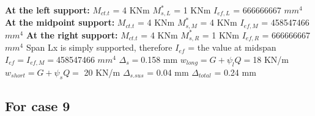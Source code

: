 \documentclass{article}%
\begin{document}
%
\newline%
\newline%
%
\textbf{At the left support:}%
\newline%
\newline%
%
$M_{ct.t}$ = 4 KNm%
\newline%
%
$M_{s,L}^{*}$ = 1 KNm%
\newline%
%
$I_{ef,L}$ = 666666667 $mm^{4}$%
\newline%
\newline%
%
\textbf{At the midpoint support:}%
\newline%
\newline%
%
$M_{ct.t}$ = 4 KNm%
\newline%
%
$M_{s,M}^{*}$ = 4 KNm%
\newline%
%
$I_{ef,M}$ = 458547466 $mm^{4}$%
\newline%
\newline%
%
\textbf{At the right support:}%
\newline%
\newline%
%
$M_{ct.t}$ = 4 KNm%
\newline%
%
$M_{s,R}^{*}$ = 1 KNm%
\newline%
%
$I_{ef,R}$ = 666666667 $mm^{4}$%
\newline%
\newline%
%
Span Lx is simply supported, therefore $I_{ef}$ = the value at midspan%
\newline%
\newline%
%
$I_{ef} = I_{ef,M} = $458547466 $ mm^{4}$%
\newline%
\newline%
%
$\Delta_{s} =$0.158 mm%
\newline%
\newline%
%
$w_{long} = G + \psi_{l}Q = $18 KN/m%
\newline%
%
$w_{short} = G + \psi_{s}Q = $ 20 KN/m%
\newline%
\newline%
%
$\Delta_{s.sus}$ = 0.04 mm%
\newline%
\newline%
%
$\Delta_{total}$ = 0.24 mm%
\subsection*{For case 9}%
\label{subsec:Forcase9}%
\end{document}
